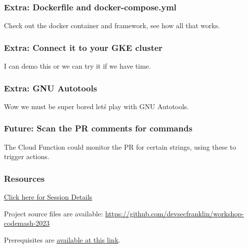 \documentclass[aspectratio=169]{beamer}
\begin{document}
\begin{frame}
	\frametitle{Extra: Dockerfile and docker-compose.yml}

	Check out the docker container and framework, see how all that works.

\end{frame}


\begin{frame}
	\frametitle{Extra: Connect it to your GKE cluster}

	I can demo this or we can try it if we have time.

\end{frame}

\begin{frame}
	\frametitle{Extra: GNU Autotools}

	Wow we must be super bored let\'s play with GNU Autotools.

\end{frame}

\begin{frame}
	\frametitle{Future: Scan the PR comments for commands}

	The Cloud Function could monitor the PR for certain strings, using these to trigger actions.

\end{frame}

\begin{frame}
	\frametitle{Resources}
	\href{https://www.codemash.org/session-details/?id=375030}{Click here for Session Details}
	\vspace{2mm}

	Project source files are available: \url{https://github.com/devsecfranklin/workshop-codemash-2023}
	\vspace{2mm}

	Prerequisites are \href{https://prereqs.codemash.org/}{available at this link}.
\end{frame}
\end{document}
